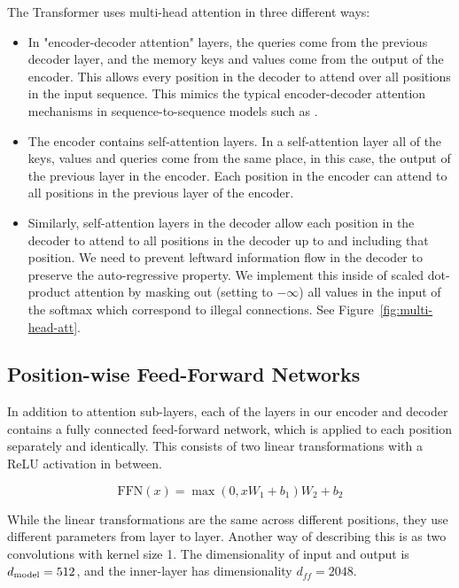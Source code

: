 The Transformer uses multi-head attention in three different ways:
\begin{itemize}
  \item In "encoder-decoder attention" layers, the queries come from the
        previous decoder layer, and the memory keys and values come from the output of
        the encoder.   This allows every position in the decoder to attend over all
        positions in the input sequence.  This mimics the typical encoder-decoder
        attention mechanisms in sequence-to-sequence models such as
        \citep{wu2016google, bahdanau2014neural,JonasFaceNet2017}.

  \item The encoder contains self-attention layers.  In a self-attention layer
        all of the keys, values and queries come from the same place, in this case, the
        output of the previous layer in the encoder.   Each position in the encoder can
        attend to all positions in the previous layer of the encoder.

  \item Similarly, self-attention layers in the decoder allow each position in
        the decoder to attend to all positions in the decoder up to and including that
        position.  We need to prevent leftward information flow in the decoder to
        preserve the auto-regressive property.	We implement this inside of scaled
        dot-product attention by masking out (setting to $-\infty$) all values in the
        input of the softmax which correspond to illegal connections.  See
        Figure~\ref{fig:multi-head-att}.

\end{itemize}

\subsection{Position-wise Feed-Forward Networks}\label{sec:ffn}

In addition to attention sub-layers, each of the layers in our encoder and
decoder contains a fully connected feed-forward network, which is applied to
each position separately and identically.  This consists of two linear
transformations with a ReLU activation in between.

\begin{equation}
  \mathrm{FFN}(x)=\max(0, xW_1 + b_1) W_2 + b_2
\end{equation}

While the linear transformations are the same across different positions, they
use different parameters from layer to layer. Another way of describing this is
as two convolutions with kernel size 1.  The dimensionality of input and output
is $d_{\text{model}}=512$, and the inner-layer has dimensionality $d_{ff}=2048$.

